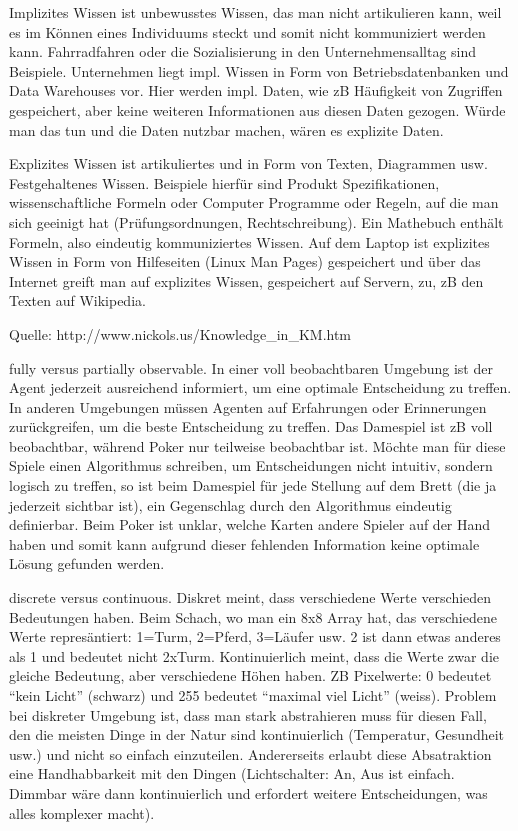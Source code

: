 \documentclass[10pt,a4paper]{article}
\begin{document}
Implizites Wissen ist unbewusstes Wissen, das man nicht artikulieren kann, weil es im Können eines Individuums steckt und somit nicht kommuniziert werden kann. Fahrradfahren oder die Sozialisierung in den Unternehmensalltag sind Beispiele.
Unternehmen liegt impl. Wissen in Form von Betriebsdatenbanken und Data Warehouses vor. Hier werden impl. Daten, wie zB Häufigkeit von Zugriffen gespeichert, aber keine weiteren Informationen aus diesen Daten gezogen. Würde man das tun und die Daten nutzbar machen, wären es explizite Daten.

Explizites Wissen ist artikuliertes und in Form von Texten, Diagrammen usw. Festgehaltenes Wissen. Beispiele hierfür sind Produkt Spezifikationen, wissenschaftliche Formeln oder Computer Programme oder Regeln, auf die man sich geeinigt hat (Prüfungsordnungen, Rechtschreibung).
Ein Mathebuch enthält Formeln, also eindeutig kommuniziertes Wissen.
Auf dem Laptop ist explizites Wissen in Form von Hilfeseiten (Linux Man Pages) gespeichert und über das Internet greift man auf explizites Wissen, gespeichert auf Servern, zu, zB den Texten auf Wikipedia.

Quelle: http://www.nickols.us/Knowledge_in_KM.htm



fully versus partially observable. 
In einer voll beobachtbaren Umgebung ist der Agent jederzeit ausreichend informiert, um eine optimale Entscheidung zu treffen. In anderen Umgebungen müssen Agenten auf Erfahrungen oder Erinnerungen zurückgreifen, um die beste Entscheidung zu treffen.
Das Damespiel ist zB voll beobachtbar, während Poker nur teilweise beobachtbar ist. Möchte man für diese Spiele einen Algorithmus schreiben, um Entscheidungen nicht intuitiv, sondern logisch zu treffen, so ist beim Damespiel für jede Stellung auf dem Brett (die ja jederzeit sichtbar ist), ein Gegenschlag durch den Algorithmus eindeutig definierbar. Beim Poker ist unklar, welche Karten andere Spieler auf der Hand haben und somit kann aufgrund dieser fehlenden Information keine optimale Lösung gefunden werden.

discrete versus continuous. 
Diskret meint, dass verschiedene Werte verschieden Bedeutungen haben. Beim Schach, wo man ein 8x8 Array hat, das verschiedene Werte represäntiert: 1=Turm, 2=Pferd, 3=Läufer usw. 2 ist dann etwas anderes als 1 und bedeutet nicht 2xTurm.
Kontinuierlich meint, dass die Werte zwar die gleiche Bedeutung, aber verschiedene Höhen haben. ZB Pixelwerte: 0 bedeutet “kein Licht” (schwarz) und 255 bedeutet “maximal viel Licht” (weiss). 
Problem bei diskreter Umgebung ist, dass man stark abstrahieren muss für diesen Fall, den die meisten Dinge in der Natur sind kontinuierlich (Temperatur, Gesundheit usw.) und nicht so einfach einzuteilen. Andererseits erlaubt diese Absatraktion eine Handhabbarkeit mit den Dingen (Lichtschalter: An, Aus ist einfach. Dimmbar wäre dann kontinuierlich und erfordert weitere Entscheidungen, was alles komplexer macht).
\end{document}
